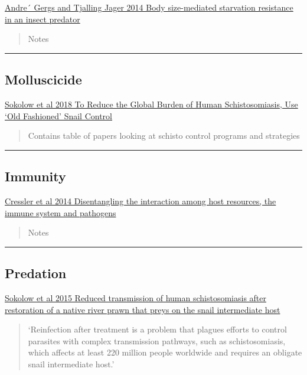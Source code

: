 \documentclass[10,portrait]{article}
\begin{document}
\href{https://besjournals.onlinelibrary.wiley.com/doi/pdf/10.1111/1365-2656.12195}{Andre´
Gergs and Tjalling Jager 2014 Body size-mediated starvation resistance
in an insect predator}

\begin{quote}
Notes
\end{quote}

\newpage  

\begin{center}\rule{0.5\linewidth}{\linethickness}\end{center}

\subsection{Molluscicide}\label{molluscicide}

\href{}{Sokolow et al 2018 To Reduce the Global Burden of Human
Schistosomiasis, Use `Old Fashioned' Snail Control}

\begin{quote}
Contains table of papers looking at schisto control programs and
strategies
\end{quote}

\newpage  

\begin{center}\rule{0.5\linewidth}{\linethickness}\end{center}

\subsection{Immunity}\label{immunity}

\href{https://onlinelibrary.wiley.com/doi/pdf/10.1111/ele.12229}{Cressler
et al 2014 Disentangling the interaction among host resources, the
immune system and pathogens}

\begin{quote}
Notes
\end{quote}

\newpage  

\begin{center}\rule{0.5\linewidth}{\linethickness}\end{center}

\subsection{Predation}\label{predation}

\href{http://www.pnas.org/content/pnas/early/2015/07/15/1502651112.full.pdf}{Sokolow
et al 2015 Reduced transmission of human schistosomiasis after
restoration of a native river prawn that preys on the snail intermediate
host}

\begin{quote}
`Reinfection after treatment is a problem that plagues efforts to
control parasites with complex transmission pathways, such as
schistosomiasis, which affects at least 220 million people worldwide and
requires an obligate snail intermediate host.'
\end{quote}

\begin{quote}
\end{quote}

\printbibliography
\end{document}
